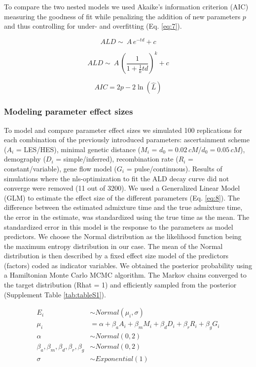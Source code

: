 \documentclass[]{article}
\begin{document}
To compare the two nested models we used Akaike's information criterion
(AIC) measuring the goodness of fit while penalizing the addition of new
parameters \(p\) and thus controlling for under- and overfitting (Eq.
\ref{eq:7}).

\begin{equation}
\label{eq:5}
ALD \sim\ A\,e^{-td}+c
\end{equation}

\begin{equation}
\label{eq:6}
ALD \sim\ A\,\left( \frac{1}{1 + \frac{1}{k}td}\right) ^k+c
\end{equation}

\begin{equation}
\label{eq:7}
AIC = 2p - 2\ln(\hat{L})
\end{equation}

\subsubsection{Modeling parameter effect sizes}\label{modeling prameter effect sizes}

To model and compare parameter effect sizes we simulated 100
replications for each combination of the previously introduced
parameters: ascertainment scheme ($A_i$ = LES/HES), minimal genetic distance
($M_i$ = \(d_{0}=0.02\,cM\)/\(d_{0}=0.05\,cM\)), demography ($D_i$ = simple/inferred),
recombination rate ($R_i$ = constant/variable), gene flow model
($G_i$ = pulse/continuous). Results of simulations where the nls-optimization to
fit the ALD decay curve did not converge were removed (11 out of 3200).
We used a Generalized Linear Model (GLM)  to estimate the effect
size of the different parameters (Eq.
\ref{eq:8}). The difference between the estimated
admixture time and the true admixture time, the error in the estimate,
was standardized using the true time as the mean. The standardized error in this model is the response to the parameters as model
predictors. We choose the Normal distribution as the likelihood function being the maximum entropy distribution in our case. The mean of the Normal distribution is then described by a fixed effect size model of the predictors (factors) coded as indicator variables. We obtained the posterior probability using a Hamiltonian Monte Carlo MCMC algorithm. The Markov chains converged to the target distribution (Rhat = 1) and efficiently sampled from the posterior (Supplement Table \ref{tab:tableS1}).  

\begin{equation}\label{eq:8}
\begin{split}
E_i &\sim Normal(\mu_i,\sigma) \\
\mu_i &= \alpha + \beta_aA_i + \beta_mM_i + \beta_dD_i + \beta_rR_i + \beta_gG_i \\
\alpha &\sim Normal(0,2) \\
\beta_a,\beta_m,\beta_d,\beta_r,\beta_g &\sim Normal(0,2) \\
\sigma &\sim Exponential(1)
\end{split}
\end{equation}
\end{document}
